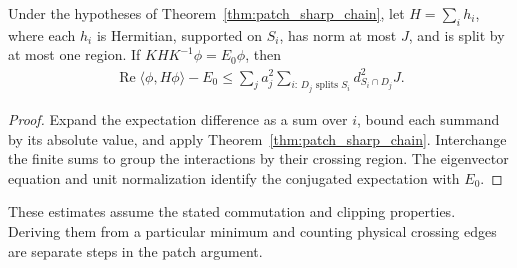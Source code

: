 \begin{theorem}
    \label{thm:patch_sharp_energy}
    \leanok
    Under the hypotheses of Theorem~\ref{thm:patch_sharp_chain}, let
    $H=\sum_i h_i$, where each $h_i$ is Hermitian, supported on $S_i$,
    has norm at most $J$, and is split by at most one region. If
    $KHK^{-1}\phi=E_0\phi$, then
    \begin{align*}
        \operatorname{Re}\langle\phi,H\phi\rangle-E_0
        \le \sum_j a_j^2\sum_{i:\,D_j\text{ splits }S_i}
        d_{S_i\cap D_j}^2 J.
    \end{align*}
\end{theorem}
\begin{proof}\leanok
    Expand the expectation difference as a sum over $i$, bound each
    summand by its absolute value, and apply
    Theorem~\ref{thm:patch_sharp_chain}. Interchange the finite sums to
    group the interactions by their crossing region. The eigenvector
    equation and unit normalization identify the conjugated expectation
    with $E_0$.
\end{proof}

These estimates assume the stated commutation and clipping properties.
Deriving them from a particular minimum and counting physical crossing
edges are separate steps in the patch argument.

